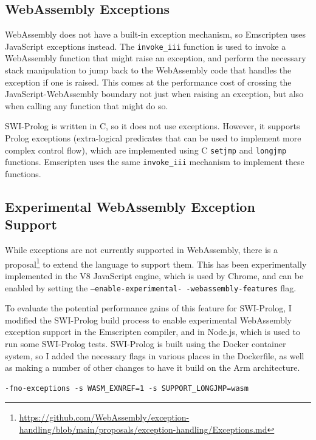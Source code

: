\subsection{WebAssembly Exceptions}

WebAssembly does not have a built-in exception mechanism, so Emscripten uses JavaScript exceptions instead. The \texttt{invoke\_iii} function is used to invoke a WebAssembly function that might raise an exception, and perform the necessary stack manipulation to jump back to the WebAssembly code that handles the exception if one is raised. This comes at the performance cost of crossing the JavaScript-WebAssembly boundary not just when raising an exception, but also when calling any function that might do so.

SWI-Prolog is written in C, so it does not use exceptions. However, it supports Prolog exceptions (extra-logical predicates that can be used to implement more complex control flow), which are implemented using C \texttt{setjmp} and \texttt{longjmp} functions. Emscripten uses the same \texttt{invoke\_iii} mechanism to implement these functions.

\subsection{Experimental WebAssembly Exception Support}

While exceptions are not currently supported in WebAssembly, there is a proposal\footnote{\url{https://github.com/WebAssembly/exception-handling/blob/main/proposals/exception-handling/Exceptions.md}} to extend the language to support them. This has been experimentally implemented in the V8 JavaScript engine, which is used by Chrome, and can be enabled by setting the \texttt{--enable-experimental- -webassembly-features} flag.

To evaluate the potential performance gains of this feature for SWI-Prolog, I modified the SWI-Prolog build process to enable experimental WebAssembly exception support in the Emscripten compiler, and in Node.js, which is used to run some SWI-Prolog tests. SWI-Prolog is built using the Docker container system, so I added the necessary flags in various places in the Dockerfile, as well as making a number of other changes to have it build on the Arm architecture.

\begin{verbatim}
-fno-exceptions -s WASM_EXNREF=1 -s SUPPORT_LONGJMP=wasm
\end{verbatim}

